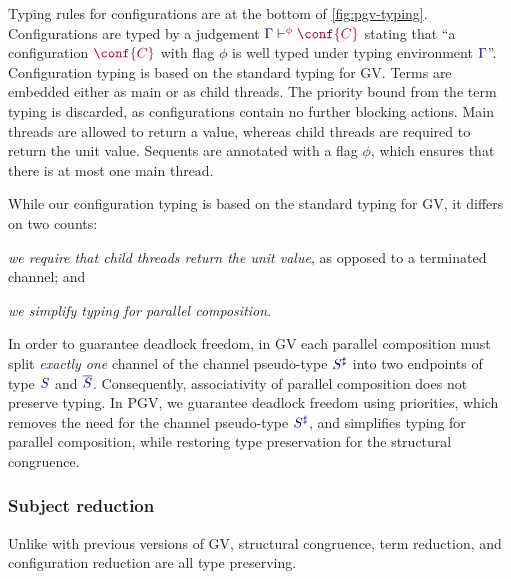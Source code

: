 \documentclass[main.tex]{subfiles}
\begin{document}
Typing rules for configurations are at the bottom of \cref{fig:pgv-typing}. Configurations are typed by a judgement $\cseq[\phi]{\ty{\Gamma}}{\conf{C}}$ stating that ``a configuration $\tm{\conf{C}}$ with flag $\phi$ is well typed under typing environment $\ty{\Gamma}$''. Configuration typing is based on the standard typing for GV. Terms are embedded either as main or as child threads. The priority bound from the term typing is discarded, as configurations contain no further blocking actions. Main threads are allowed to return a value, whereas child threads are required to return the unit value. Sequents are annotated with a flag $\phi$, which ensures that there is at most one main thread.

While our configuration typing is based on the standard typing for GV, it differs on two counts:
\begin{enumerate*}[label= (\roman*) ]
\item \emph{we require that child threads return the unit value}, as opposed to a terminated channel; and
\item \emph{we simplify typing for parallel composition}.
\end{enumerate*}
In order to guarantee deadlock freedom, in GV each parallel composition must split \emph{exactly one} channel of the channel pseudo-type $\ty{S^\sharp}$ into two endpoints of type $\ty{S}$ and $\ty{\co{S}}$. Consequently, associativity of parallel composition does not preserve typing. In PGV, we guarantee deadlock freedom using priorities, which removes the need for the channel pseudo-type $\ty{S^\sharp}$, and simplifies typing for parallel composition, while restoring type preservation for the structural congruence.


\subsubsection*{Subject reduction}
Unlike with previous versions of GV, structural congruence, term reduction, and configuration reduction are all type preserving.
\end{document}
